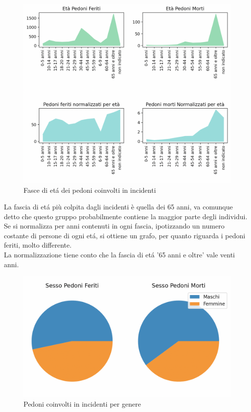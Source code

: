 \documentclass[a4paper]{report}
\begin{document}
\begin{figure}
    \includegraphics[width=\linewidth]{../src/incidenti/incidenti_senza_coords/pedoni/eta_pedoni.png}
    \caption{Fasce di et\'a dei pedoni coinvolti in incidenti}
    \label{fig:eta_pedoni}
\end{figure}

La fascia di et\'a più colpita dagli incidenti è quella dei 65 anni, 
va comunque detto che questo gruppo probabilmente contiene la maggior parte degli individui.
Se si normalizza per anni contenuti in ogni fascia, ipotizzando un numero
costante di persone di ogni et\'a, si ottiene un grafo, per quanto riguarda i pedoni 
feriti, molto differente. \\
La normalizzazione tiene conto che la fascia di et\'a '65 anni e oltre' vale venti anni.



\begin{figure}
    \includegraphics[width=\linewidth]{../src/incidenti/incidenti_senza_coords/pedoni/sesso_morti_feriti.png}
    \caption{Pedoni coinvolti in incidenti per genere}
    \label{fig:sesso_morti_feriti}
\end{figure}
\end{document}

